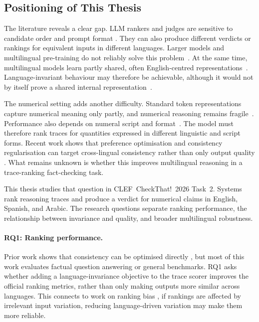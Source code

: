 \subsection{Positioning of This Thesis}
\label{subsec:positioning}

The literature reveals a clear gap. LLM rankers and judges are sensitive to
candidate order and prompt format
\cite{shi2025judgingjudgessystematicstudy,qiao2026llmbasedlistwisererankingeffect}.
They can also produce different verdicts or rankings for equivalent inputs in
different languages. Larger models and multilingual pre-training do not reliably
solve this problem~\cite{fu2025reliablemultilingualllmasajudge,Qi_2023,Fierro_2022}.
At the same time, multilingual models learn partly shared, often English-centred
representations~\cite{wendler2024llamasworkenglishlatent,
conneau2020unsupervisedcrosslingualrepresentationlearning}. Language-invariant
behaviour may therefore be achievable, although it would not by itself prove a
shared internal representation~\cite{ifergan2024beneathsurfaceconsistencyexploring}.

The numerical setting adds another difficulty. Standard token representations
capture numerical meaning only partly, and numerical reasoning remains
fragile~\cite{wallace2019nlpmodelsknownumbers,
rahman2025fragilenumbersenseprobing}. Performance also depends on numeral script
and format~\cite{reddy2026effectscriptsformatsllm}. The model must therefore rank
traces for quantities expressed in different linguistic and script forms. Recent
work shows that preference optimisation and consistency regularisation can target
cross-lingual consistency rather than only output quality
\cite{liu2026posttraininglanguagemodelscrosslingual,
wang2025calmunleashingcrosslingualselfaligning,
zheng2021consistencyregularizationcrosslingualfinetuning}. What remains unknown is
whether this improves multilingual reasoning in a trace-ranking fact-checking
task.

This thesis studies that question in CLEF~CheckThat!~2026 Task~2. Systems rank
reasoning traces and produce a verdict for numerical claims in English, Spanish,
and Arabic. The research questions separate ranking performance, the relationship
between invariance and quality, and broader multilingual robustness.

\paragraph{RQ1: Ranking performance.}
Prior work shows that consistency can be optimised directly
\cite{zheng2021consistencyregularizationcrosslingualfinetuning,
wang2025calmunleashingcrosslingualselfaligning,
liu2026posttraininglanguagemodelscrosslingual}, but most of this work evaluates
factual question answering or general benchmarks. RQ1 asks whether adding a
language-invariance objective to the trace scorer improves the official ranking
metrics, rather than only making outputs more similar across languages. This
connects to work on ranking bias
\cite{shi2025judgingjudgessystematicstudy,
qiao2026llmbasedlistwisererankingeffect,
qin2024largelanguagemodelseffective}, if rankings are affected by irrelevant
input variation, reducing language-driven variation may make them more reliable.

